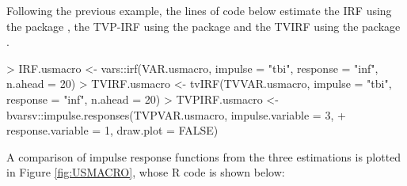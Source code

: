 Following the previous example, the lines of code below estimate the IRF using the package , the TVP-IRF using the package  and the TVIRF using the package . 

\begin{Schunk}
\begin{Sinput}
> IRF.usmacro <- vars::irf(VAR.usmacro, impulse = "tbi", response = "inf", n.ahead = 20)
> TVIRF.usmacro <- tvIRF(TVVAR.usmacro, impulse = "tbi", response = "inf", n.ahead = 20)
> TVPIRF.usmacro <- bvarsv::impulse.responses(TVPVAR.usmacro, impulse.variable = 3,
+                                             response.variable = 1, draw.plot = FALSE)
\end{Sinput}
\end{Schunk}

A comparison of impulse response functions from the three estimations is plotted in Figure  \ref{fig:USMACRO}, whose R code is shown below:

\begin{Schunk}
\end{Schunk}

